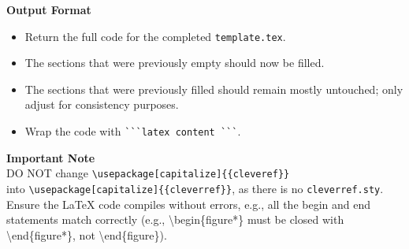 \vspace{1em}
\noindent\textbf{Output Format}
\begin{itemize}
    \item Return the full code for the completed \texttt{template.tex}.
    \item The sections that were previously empty should now be filled.
    \item The sections that were previously filled should remain mostly untouched; only adjust for consistency purposes.
    \item Wrap the code with \verb|```latex content ```|.
\end{itemize}

\vspace{1em}
\noindent\textbf{Important Note}\\
\vspace{0.5em}
DO NOT change \texttt{\textbackslash{}usepackage[capitalize]\{\{cleveref\}\}} \\
into \texttt{\textbackslash{}usepackage[capitalize]\{\{cleverref\}\}}, as there is no \texttt{cleverref.sty}.\\
Ensure the LaTeX code compiles without errors, e.g., all the begin and end statements match correctly (e.g., \textbackslash{}begin\{figure*\} must be closed with \textbackslash{}end\{figure*\}, not \textbackslash{}end\{figure\}).